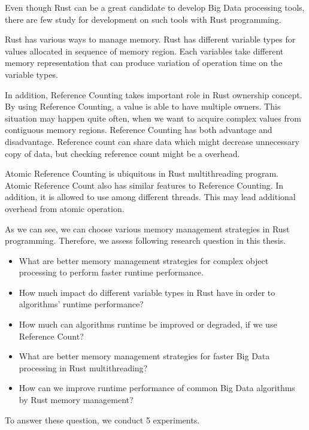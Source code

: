 
Even though Rust can be a great candidate to develop Big Data processing tools, there are few study for development on such tools with Rust programming. 

Rust has various ways to manage memory. Rust has different variable types for values allocated in sequence of memory region. 
Each variables take different memory representation that can produce variation of operation time on the variable types.

In addition, Reference Counting takes important role in Rust ownership concept. By using Reference Counting, a value is able to have multiple owners.
This situation may happen quite often, when we want to acquire complex values from contiguous memory regions. 
Reference Counting has both advantage and disadvantage. 
Reference count can share data which might decrease unnecessary copy of data, but checking reference count might be a overhead. 

Atomic Reference Counting is ubiquitous in Rust multithreading program. Atomic Reference Count also has similar features to Reference Counting. 
In addition, it is allowed to use among different threads. This may lead additional overhead from atomic operation.

As we can see, we can choose various memory management strategies in Rust programming.
Therefore, we assess following research question in this thesis.
\begin{itemize}
    \item What are better memory management strategies for complex object processing to perform faster runtime performance.
    \item How much impact do different variable types in Rust have in order to algorithms' runtime performance?
    \item How much can algorithms runtime be improved or degraded, if we use Reference Count?
    \item What are better memory management strategies for faster Big Data processing in Rust multithreading?
    \item How can we improve runtime performance of common Big Data algorithms by Rust memory management?
\end{itemize}

To answer these question, we conduct 5 experiments. 



